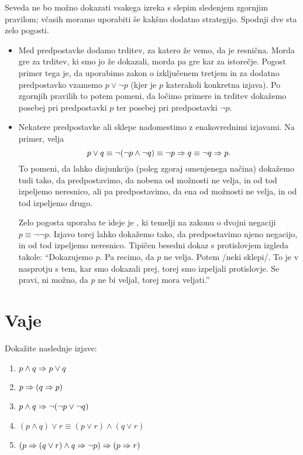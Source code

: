         Seveda ne bo možno dokazati vsakega izreka s slepim sledenjem zgornjim pravilom; včasih moramo uporabiti še kakšno dodatno strategijo. Spodnji dve sta zelo pogosti.
        \begin{itemize}
                \item
                        Med predpostavke dodamo trditev, za katero že vemo, da je resnična. Morda gre za trditev, ki smo jo že dokazali, morda pa gre kar za istorečje. Pogost primer tega je, da uporabimo zakon o izključenem tretjem in za dodatno predpostavko vzamemo $p \lor \lnot{p}$ (kjer je $p$ katerakoli konkretna izjava). Po zgornjih pravilih to potem pomeni, da ločimo primere in trditev dokažemo posebej pri predpostavki $p$ ter posebej pri predpostavki $\lnot{p}$.
                \item
                        Nekatere predpostavke ali sklepe nadomestimo z enakovrednimi izjavami. Na primer, velja
                        \[p \lor q \equiv \lnot(\lnot{p} \land \lnot{q}) \equiv \lnot{p} \Rightarrow q \equiv \lnot{q} \Rightarrow p.\]
                        To pomeni, da lahko disjunkcijo (poleg zgoraj omenjenega načina) dokažemo tudi tako, da predpostavimo, da nobena od možnosti ne velja, in od tod izpeljemo neresnico, ali pa predpostavimo, da ena od možnosti ne velja, in od tod izpeljemo drugo.

                        Zelo pogosta uporaba te ideje je , ki temelji na zakonu o dvojni negaciji $p \equiv \lnot\lnot{p}$. Izjavo torej lahko dokažemo tako, da predpostavimo njeno negacijo, in od tod izpeljemo neresnico. Tipičen besedni dokaz s protislovjem izgleda takole: ``Dokazujemo $p$. Pa recimo, da $p$ ne velja. Potem /neki sklepi/. To je v nasprotju s tem, kar smo dokazali prej, torej smo izpeljali protislovje. Se pravi, ni možno, da $p$ ne bi veljal, torej mora veljati.''
        \end{itemize}



\section{Vaje}


\begin{vaja}
  Dokažite naslednje izjave:
  \begin{enumerate}
  \item $p \land q \Rightarrow p \lor q$
  \item $p \Rightarrow (q \Rightarrow p)$
  \item $p \land q \Rightarrow \lnot (\lnot p \lor \lnot q)$
  \item $(p \land q) \lor r \equiv (p \lor r) \land (q \lor r)$
  \item $(p \Rightarrow (q  \lor r) \land q \Rightarrow \lnot p) \Rightarrow (p \Rightarrow r)$
  \end{enumerate}
\end{vaja}

